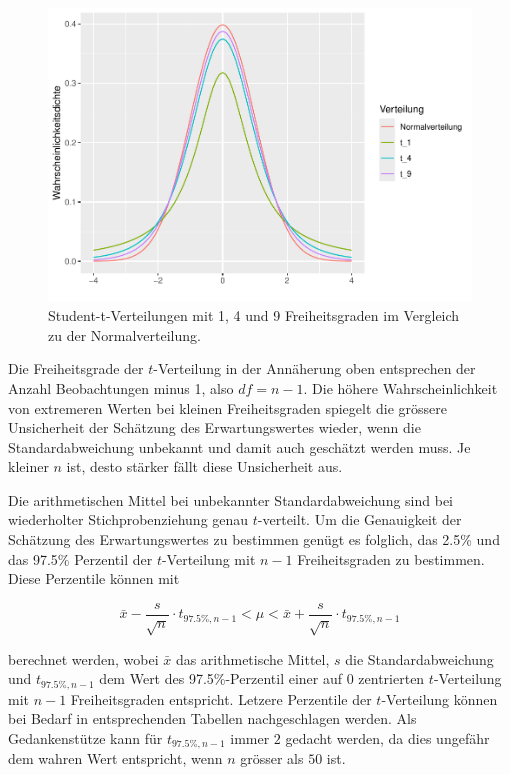 \documentclass[
]{book}
\theoremstyle{definition}
\theoremstyle{definition}
\theoremstyle{definition}
\theoremstyle{definition}
\theoremstyle{remark}
\begin{document}
\begin{figure}
\centering
\includegraphics{aps_statistik1_files/figure-latex/t-distribution-1.pdf}
\caption{\label{fig:t-distribution}Student-t-Verteilungen mit 1, 4 und 9 Freiheitsgraden im Vergleich zu der Normalverteilung.}
\end{figure}

Die Freiheitsgrade der \(t\)-Verteilung in der Annäherung oben entsprechen der Anzahl Beobachtungen minus 1, also \(df = n-1\). Die höhere Wahrscheinlichkeit von extremeren Werten bei kleinen Freiheitsgraden spiegelt die grössere Unsicherheit der Schätzung des Erwartungswertes wieder, wenn die Standardabweichung unbekannt und damit auch geschätzt werden muss. Je kleiner \(n\) ist, desto stärker fällt diese Unsicherheit aus.

Die arithmetischen Mittel bei unbekannter Standardabweichung sind bei wiederholter Stichprobenziehung genau \(t\)-verteilt. Um die Genauigkeit der Schätzung des Erwartungswertes zu bestimmen genügt es folglich, das 2.5\% und das 97.5\% Perzentil der \(t\)-Verteilung mit \(n-1\) Freiheitsgraden zu bestimmen. Diese Perzentile können mit

\[ \bar{x} - \frac{s}{\sqrt{n}} \cdot t_{97.5\%, n-1} < \mu < \bar{x} + \frac{s}{\sqrt{n}} \cdot t_{97.5\%, n-1}\]

berechnet werden, wobei \(\bar{x}\) das arithmetische Mittel, \(s\) die Standardabweichung und \(t_{97.5\%, n-1}\) dem Wert des 97.5\%-Perzentil einer auf 0 zentrierten \(t\)-Verteilung mit \(n-1\) Freiheitsgraden entspricht. Letzere Perzentile der \(t\)-Verteilung können bei Bedarf in entsprechenden Tabellen nachgeschlagen werden. Als Gedankenstütze kann für \(t_{97.5\%, n-1}\) immer \(2\) gedacht werden, da dies ungefähr dem wahren Wert entspricht, wenn \(n\) grösser als \(50\) ist.
\end{document}
